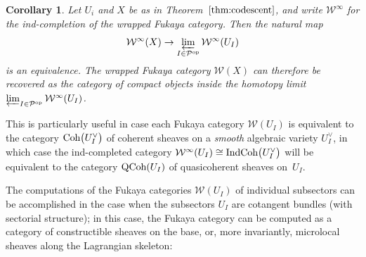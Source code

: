 \documentclass[pdftex]{sigma}%
\numberwithin{equation}{section}
\newtheorem{Corollary}[Theorem]{Corollary}
\def\cW{\mathcal{W}}
\def\calP{\mathcal{P}}
\newcommand{\Coh}{\textup{Coh}}
\newcommand{\Ind}{\textup{Ind}}
\newcommand{\QCoh}{\textup{QCoh}}
\begin{document}
\begin{Corollary}\label{cor:descent}
 Let $U_i$ and $X$ be as in Theorem~$\ref{thm:codescent}$, and write $\cW^\infty$ for the ind-completion of the wrapped Fukaya category. Then the natural map
 \[
 \cW^\infty(X)\to\varprojlim_{I\in \calP^{\rm op}}\cW^\infty(U_I)
 \]
 is an equivalence. The wrapped Fukaya category $\cW(X)$ can therefore be recovered as the category of compact objects inside the homotopy limit $\varprojlim_{I\in \calP^{\rm op}}\cW^\infty(U_I)$.
\end{Corollary}
This is particularly useful in case each Fukaya category $\cW(U_I)$ is equivalent to the category $\Coh\big(U_I^\vee\big)$ of coherent sheaves on a {\em smooth} algebraic variety $U_I^\vee$, in which case the ind-completed category $\cW^\infty(U_I)\cong \Ind\Coh\big(U_I^\vee\big)$ will be equivalent to the category $\QCoh(U_I)$ of quasicoherent sheaves on~$U_I$.

The computations of the Fukaya categories $\cW(U_I)$ of individual subsectors can be accomplished in the case when the subsectors $U_I$ are cotangent bundles (with sectorial structure); in this case, the Fukaya category can be computed as a category of constructible sheaves on the base, or, more invariantly, microlocal sheaves along the Lagrangian skeleton:
\end{document}
